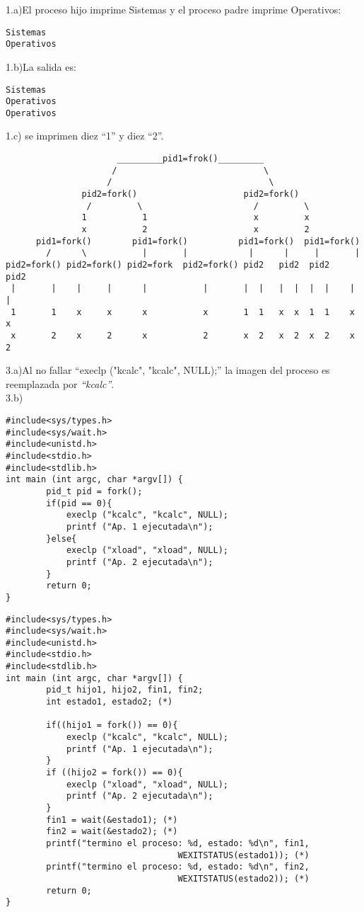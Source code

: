 \documentclass{article}
\begin{document}
1.a)El proceso hijo imprime Sistemas y el proceso padre imprime Operativos:
\begin{verbatim}
Sistemas
Operativos
\end{verbatim}

1.b)La salida es:
\begin{verbatim}
Sistemas
Operativos
Operativos
\end{verbatim}

1.c) se imprimen diez ``1'' y diez ``2''.

\begin{verbatim}
                      _________pid1=frok()_________
                     /                             \
                    /                               \
               pid2=fork()                     pid2=fork()
                /         \                      /         \
               1           1                     x         x
               x           2                     x         2
      pid1=fork()        pid1=fork()          pid1=fork()  pid1=fork()
        /      \           |       |            |      |     |       |
pid2=fork() pid2=fork() pid2=fork  pid2=fork() pid2   pid2  pid2    pid2
 |       |    |     |      |           |       |  |   |  |  |  |    |  |
 1       1    x     x      x           x       1  1   x  x  1  1    x  x
 x       2    x     2      x           2       x  2   x  2  x  2    x  2
\end{verbatim}

3.a)Al no fallar ``execlp ("kcalc", "kcalc", NULL);''
la imagen del proceso es reemplazada por \emph{``kcalc''}.\\

3.b)
\begin{verbatim}
#include<sys/types.h>
#include<sys/wait.h>
#include<unistd.h>
#include<stdio.h>
#include<stdlib.h>
int main (int argc, char *argv[]) {
        pid_t pid = fork();
        if(pid == 0){
            execlp ("kcalc", "kcalc", NULL);
            printf ("Ap. 1 ejecutada\n");
        }else{
            execlp ("xload", "xload", NULL);
            printf ("Ap. 2 ejecutada\n");
        }
        return 0;
}
\end{verbatim}
\begin{verbatim}
#include<sys/types.h>
#include<sys/wait.h>
#include<unistd.h>
#include<stdio.h>
#include<stdlib.h>
int main (int argc, char *argv[]) {
        pid_t hijo1, hijo2, fin1, fin2;
        int estado1, estado2; (*)
        
        if((hijo1 = fork()) == 0){
            execlp ("kcalc", "kcalc", NULL);
            printf ("Ap. 1 ejecutada\n");
        }
        if ((hijo2 = fork()) == 0){
            execlp ("xload", "xload", NULL);
            printf ("Ap. 2 ejecutada\n");
        }
        fin1 = wait(&estado1); (*)
        fin2 = wait(&estado2); (*)
        printf("termino el proceso: %d, estado: %d\n", fin1, 
                                  WEXITSTATUS(estado1)); (*)
        printf("termino el proceso: %d, estado: %d\n", fin2,
                                  WEXITSTATUS(estado2)); (*)
        return 0;
}
\end{verbatim}
\end{document}
